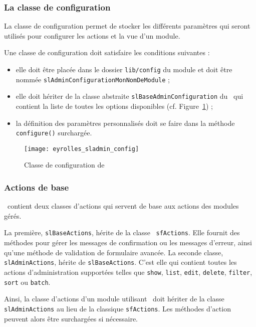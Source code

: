 \subsubsection{La classe de configuration}

La classe de configuration permet de stocker les différents paramètres qui seront utilisés pour configurer les actions et la vue d'un module.

Une classe de configuration doit satisfaire les conditions suivantes :
\begin{itemize}
	\item elle doit être placée dans le dossier \texttt{lib/config} du module et doit être nommée \texttt{slAdminConfigurationMonNomDeModule} ;
	\item elle doit hériter de la classe abstraite \texttt{slBaseAdminConfiguration} du \aplugin\, qui contient la liste de toutes les options disponibles (cf. Figure~\ref{figure:eyrolles_sladmin_config}) ;
	\item la définition des paramètres personnalisés doit se faire dans la méthode \texttt{configure()} surchargée.
\end{itemize}

\begin{figure}
	\centering
	\texttt{[image: eyrolles\_sladmin\_config]}
	\caption{Classe de configuration de \asladmin}
	\label{figure:eyrolles_sladmin_config}
\end{figure}


\subsubsection{Actions de base}

\asladmin\ contient deux classes d'actions qui servent de base aux actions des modules gérés.

La première, \texttt{slBaseActions}, hérite de la classe \asf\ \texttt{sfActions}. Elle fournit des méthodes pour gérer les messages de confirmation ou les messages d'erreur, ainsi qu'une méthode de validation de formulaire avancée. La seconde classe, \texttt{slAdminActions}, hérite de \texttt{slBaseActions}. C'est elle qui contient toutes les actions d'administration supportées telles que \texttt{show}, \texttt{list}, \texttt{edit}, \texttt{delete}, \texttt{filter}, \texttt{sort} ou \texttt{batch}.

Ainsi, la classe d'actions d'un module utilisant \asladmin\ doit hériter de la classe \texttt{slAdminActions} au lieu de la classique \texttt{sfActions}. Les méthodes d'action peuvent alors être surchargées si nécessaire.

